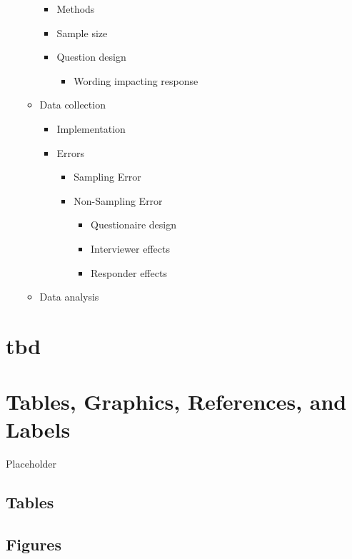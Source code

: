 \documentclass[12pt,twoside]{reedthesis}
\providecommand{\tightlist}{%
  \setlength{\itemsep}{0pt}\setlength{\parskip}{0pt}}
\begin{document}
\begin{itemize}
\begin{itemize}
\begin{itemize}
    \item
      Methods
    \item
      Sample size
    \item
      Question design
      \begin{itemize}
      \tightlist
      \item
        Wording impacting response
      \end{itemize}
    \end{itemize}
  \item
    Data collection
    \begin{itemize}
    \tightlist
    \item
      Implementation
    \item
      Errors
      \begin{itemize}
      \tightlist
      \item
        Sampling Error
      \item
        Non-Sampling Error
        \begin{itemize}
        \tightlist
        \item
          Questionaire design
        \item
          Interviewer effects
        \item
          Responder effects
        \end{itemize}
      \end{itemize}
    \end{itemize}
  \item
    Data analysis
  \end{itemize}
\end{itemize}
\hypertarget{math-sci}{%
\chapter{tbd}\label{math-sci}}

\hypertarget{ref-labels}{%
\chapter{Tables, Graphics, References, and Labels}\label{ref-labels}}

Placeholder

\hypertarget{tables}{%
\section{Tables}\label{tables}}

\hypertarget{figures}{%
\section{Figures}\label{figures}}
\end{document}
